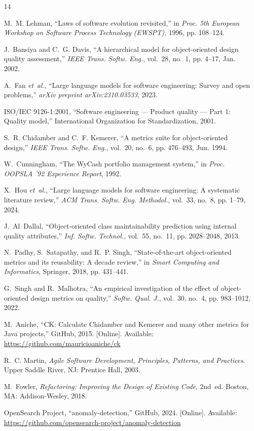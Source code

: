 \documentclass[conference]{IEEEtran}
\begin{document}
\begin{thebibliography}{14}

M.~M. Lehman, ``Laws of software evolution revisited,'' in \emph{Proc. 5th European Workshop on Software Process Technology (EWSPT)}, 1996, pp. 108--124.

J.~Bansiya and C.~G. Davis, ``A hierarchical model for object-oriented design quality assessment,'' \emph{IEEE Trans. Softw. Eng.}, vol.~28, no.~1, pp. 4--17, Jan. 2002.

A.~Fan \emph{et~al.}, ``Large language models for software engineering: Survey and open problems,'' \emph{arXiv preprint arXiv:2310.03533}, 2023.

ISO/IEC 9126-1:2001, ``Software engineering --- Product quality --- Part 1: Quality model,'' International Organization for Standardization, 2001.

S.~R. Chidamber and C.~F. Kemerer, ``A metrics suite for object-oriented design,'' \emph{IEEE Trans. Softw. Eng.}, vol.~20, no.~6, pp. 476--493, Jun. 1994.

W.~Cunningham, ``The WyCash portfolio management system,'' in \emph{Proc. OOPSLA '92 Experience Report}, 1992.

X.~Hou \emph{et~al.}, ``Large language models for software engineering: A systematic literature review,'' \emph{ACM Trans. Softw. Eng. Methodol.}, vol.~33, no.~8, pp. 1--79, 2024.

J.~Al~Dallal, ``Object-oriented class maintainability prediction using internal quality attributes,'' \emph{Inf. Softw. Technol.}, vol.~55, no.~11, pp. 2028--2048, 2013.

N.~Padhy, S.~Satapathy, and R.~P. Singh, ``State-of-the-art object-oriented metrics and its reusability: A decade review,'' in \emph{Smart Computing and Informatics}, Springer, 2018, pp. 431--441.

G.~Singh and R.~Malhotra, ``An empirical investigation of the effect of object-oriented design metrics on quality,'' \emph{Softw. Qual. J.}, vol.~30, no.~4, pp. 983--1012, 2022.

M.~Aniche, ``CK: Calculate Chidamber and Kemerer and many other metrics for Java projects,'' GitHub, 2015. [Online]. Available: \url{https://github.com/mauricioaniche/ck}

R.~C. Martin, \emph{Agile Software Development, Principles, Patterns, and Practices}. Upper Saddle River, NJ: Prentice Hall, 2003.

M.~Fowler, \emph{Refactoring: Improving the Design of Existing Code}, 2nd~ed. Boston, MA: Addison-Wesley, 2018.

OpenSearch Project, ``anomaly-detection,'' GitHub, 2024. [Online]. Available: \url{https://github.com/opensearch-project/anomaly-detection}

\end{thebibliography}
\end{document}
